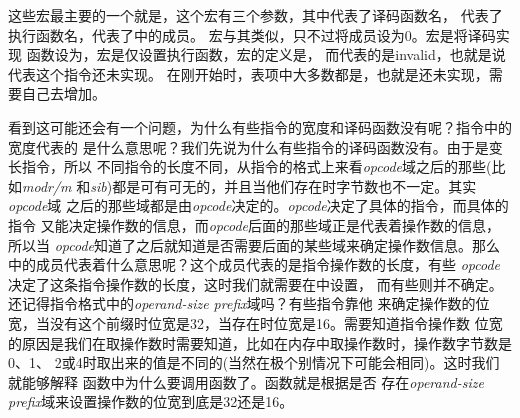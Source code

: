 这些宏最主要的一个就是，这个宏有三个参数，其中代表了译码函数名，
代表了执行函数名，代表了中的成员。
宏与其类似，只不过将成员设为0。宏是将译码实现
函数设为，宏是仅设置执行函数，宏的定义是，
而代表的是invalid，也就是说代表这个指令还未实现。
在刚开始时，表项中大多数都是，也就是还未实现，需要自己去增加。

看到这可能还会有一个问题，为什么有些指令的宽度和译码函数没有呢？指令中的宽度代表的
是什么意思呢？我们先说为什么有些指令的译码函数没有。由于\arch 是变长指令，所以
不同指令的长度不同，从指令的格式上来看\emph{opcode}域之后的那些(比如\emph{modr/m}
和\emph{sib})都是可有可无的，并且当他们存在时字节数也不一定。其实\emph{opcode}域
之后的那些域都是由\emph{opcode}决定的。\emph{opcode}决定了具体的指令，而具体的指令
又能决定操作数的信息，而\emph{opcode}后面的那些域正是代表着操作数的信息，所以当
\emph{opcode}知道了之后就知道是否需要后面的某些域来确定操作数信息。那么
中的成员代表着什么意思呢？这个成员代表的是指令操作数的长度，有些
\emph{opcode}决定了这条指令操作数的长度，这时我们就需要在中设置，
而有些则并不确定。还记得指令格式中的\emph{operand-size prefix}域吗？有些指令靠他
来确定操作数的位宽，当没有这个前缀时位宽是32，当存在时位宽是16。需要知道指令操作数
位宽的原因是我们在取操作数时需要知道，比如在内存中取操作数时，操作数字节数是0、1、
2或4时取出来的值是不同的(当然在极个别情况下可能会相同)。这时我们就能够解释
函数中为什么要调用函数了。函数就是根据是否
存在\emph{operand-size prefix}域来设置操作数的位宽到底是32还是16。
